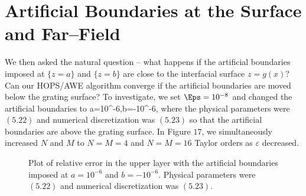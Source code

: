 \vspace{-21mm}
\section{Artificial Boundaries at the Surface and Far--Field}
\label{intro:analysis_near_surface_and_far_field}

We then asked the natural question -- what happens if the artificial boundaries imposed at $\{z=a\}$ and $\{z=b\}$ are close to the interfacial surface $z=g(x)$? Can our HOPS/AWE algorithm converge if the artificial boundaries are moved below the grating surface? To investigate, we set $\Eps = 10^{-8}$ and changed the artificial boundaries to 
\vspace{-1mm}
\bes
a=10^{-6},\quad b=-10^{-6}, 
\ees
where the physical parameters were $(5.22)$ and numerical discretization was $(5.23)$ so that the artificial boundaries are above the grating surface. In Figure $17$, we simultaneously increased $N$ and $M$ to $N=M=4$ and $N=M=16$ Taylor orders as $\varepsilon$ decreased.
\vspace{-24.5mm}
\begin{figure}[H]
\vspace{1mm}
\caption{Plot of relative error in the upper layer with the artificial boundaries imposed at $a=10^{-6}$ and $b=-10^{-6}$. Physical parameters were $(5.22)$ and numerical discretization was $(5.23)$.}
\label{Fig:Eps}
\end{figure}
